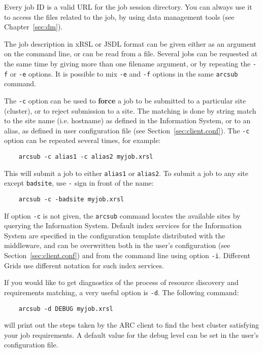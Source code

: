 \begin{framed}
   Every job ID is a valid URL for the job session directory. You can
   always use it to access the files related to the job, by using data
   management tools (see Chapter~\ref{sec:dm}).
\end{framed}

The job description in xRSL or JSDL format can be given either as an
argument on the command line, or can be read from a file. Several jobs can be
requested at the same time by giving more than one filename
argument, or by repeating the \verb#-f# or \verb#-e# options. It is
possible to mix \verb#-e# and \verb#-f# options in the same
\texttt{arcsub} command.

The \verb#-c# option can be used to \textbf{force} a job to be
submitted to a particular site (cluster), or to reject submission to a
site. The matching is done by string match to the site name (i.e.
hostname) as defined in the Information System, or to an alias, as
defined in user configuration file (see
Section~\ref{sec:client.conf}).  The \verb#-c# option can be repeated
several times, for example:
\begin{verbatim}
    arcsub -c alias1 -c alias2 myjob.xrsl
\end{verbatim}
This will submit a job to either \verb#alias1# or
\verb#alias2#. To submit a job to any site except
\verb#badsite#, use \verb#-# sign in front of the name:
\begin{verbatim}
    arcsub -c -badsite myjob.xrsl
\end{verbatim}

If option \verb#-c# is not given, the \verb#arcsub# command locates the available sites by querying the
Information System. Default index services for the Information System are specified in the
configuration template distributed with the middleware, and can be overwritten both in the user's
configuration (see Section~\ref{sec:client.conf}) and from the command line using option
\verb#-i#. Different Grids use different notation for such index services.

If you would like to get diagnostics of the process of resource
discovery and requirements matching, a very useful option is
\verb#-d#. The following command:
\begin{verbatim}
    arcsub -d DEBUG myjob.xrsl
\end{verbatim}

will print out the steps taken by the ARC client to find the
best cluster satisfying your job requirements. A default value for
the debug level can be set in the user's configuration file.


